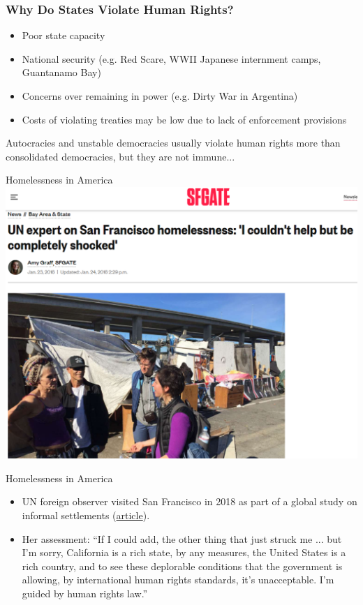 \documentclass{beamer}
\begin{document}
\begin{frame} 
	\frametitle{\LARGE{Why Do States Violate Human Rights?}}
	\begin{itemize}
		\item Poor state capacity \pause
		
		\item National security (e.g. Red Scare, WWII Japanese internment camps, Guantanamo Bay) \pause
		
		\item Concerns over remaining in power (e.g. Dirty War in Argentina)\pause 
		
		\item Costs of violating treaties may be low due to lack of enforcement provisions \pause 
	\end{itemize}
	Autocracies and unstable democracies usually violate human rights more than consolidated democracies, but they are not immune...
\end{frame}

\begin{frame}{\LARGE Homelessness in America}
	\centering
	\includegraphics[width=\textwidth,height=0.9\textheight,keepaspectratio]{SFhomeless.png}
\end{frame}

\begin{frame}{\LARGE Homelessness in America}
	\begin{itemize}
		\item UN foreign observer visited San Francisco in 2018 as part of a global study on informal settlements (\href{https://www.sfgate.com/bayarea/article/Leilani-Farah-UN-rapporteur-homelessness-SF-CA-12519117.php}{article}). \pause
		\item Her assessment: ``If I could add, the other thing that just struck me ... but I'm sorry, California is a rich state, by any measures, the United States is a rich country, and to see these deplorable conditions that the government is allowing, by international human rights standards, it's unacceptable. I'm guided by human rights law.”
		
	\end{itemize}
\end{frame}
\end{document}
